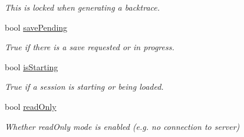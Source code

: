 \begin{DoxyCompactItemize}
\begin{DoxyCompactList}\small\item\em This is locked when generating a backtrace. \end{DoxyCompactList}\item 
\hypertarget{classGlobalSearch_1_1OptBase_a2e5ba27bde6be3257cc44b7a7bb87598}{bool \hyperlink{classGlobalSearch_1_1OptBase_a2e5ba27bde6be3257cc44b7a7bb87598}{save\-Pending}}\label{classGlobalSearch_1_1OptBase_a2e5ba27bde6be3257cc44b7a7bb87598}

\begin{DoxyCompactList}\small\item\em True if there is a save requested or in progress. \end{DoxyCompactList}\item 
\hypertarget{classGlobalSearch_1_1OptBase_a63828837cb869c94cb7309cbb7331f7c}{bool \hyperlink{classGlobalSearch_1_1OptBase_a63828837cb869c94cb7309cbb7331f7c}{is\-Starting}}\label{classGlobalSearch_1_1OptBase_a63828837cb869c94cb7309cbb7331f7c}

\begin{DoxyCompactList}\small\item\em True if a session is starting or being loaded. \end{DoxyCompactList}\item 
\hypertarget{classGlobalSearch_1_1OptBase_ac85d94d2e3b44f66461e470e04db3f0e}{bool \hyperlink{classGlobalSearch_1_1OptBase_ac85d94d2e3b44f66461e470e04db3f0e}{read\-Only}}\label{classGlobalSearch_1_1OptBase_ac85d94d2e3b44f66461e470e04db3f0e}

\begin{DoxyCompactList}\small\item\em Whether read\-Only mode is enabled (e.\-g. no connection to server) \end{DoxyCompactList}\end{DoxyCompactItemize}
